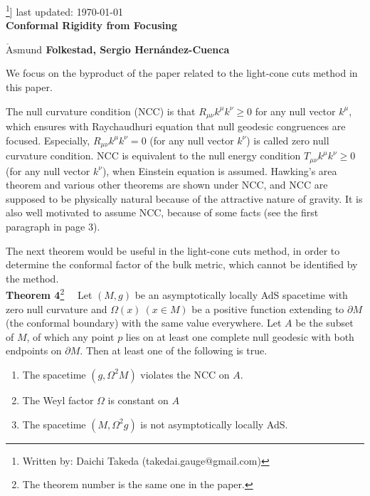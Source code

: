 \documentclass[12pt]{article}
\date{}
\renewcommand{\thefootnote}{\fnsymbol{footnote}}
\begin{document}
{\Large\noindent
\footnote{
Written by: Daichi Takeda (takedai.gauge@gmail.com)
}]
\hfill{\normalsize last updated: \today}
\\[2mm]
\textbf{Conformal Rigidity from Focusing\cite{Folkestad:2021kyz}
}
}

\noindent
\hfill
\textbf{$\mathring{\textrm{A}}\textrm{smund}$ Folkestad, Sergio Hern\' andez-Cuenca}%

\renewcommand{\thefootnote}{\arabic{footnote})}
\setcounter{footnote}{0}
\vspace{12pt}
We focus on the byproduct of the paper related to the light-cone cuts method \cite{Engelhardt:2016wgb,Engelhardt:2016crc,Hernandez-Cuenca:2020ppu} in this paper.

The null curvature condition (NCC) is that $R_{\mu\nu}k^\mu k^\nu \geq 0$ for any null vector $k^\mu$, 
which ensures with Raychaudhuri equation that null geodesic congruences are focused.
Especially, $R_{\mu\nu}k^\mu k^\nu = 0$ (for any null vector $k^\nu$) is called zero null curvature condition.
NCC is equivalent to the null energy condition $T_{\mu\nu}k^\mu k^\nu \geq 0$ (for any null vector $k^\nu$), 
when Einstein equation is assumed.
Hawking's area theorem and various other theorems are shown under NCC, 
and NCC are supposed to be physically natural because of the attractive nature of gravity.
It is also well motivated to assume NCC, because of some facts (see the first paragraph in page 3).

The next theorem would be useful in the light-cone cuts method, 
in order to determine the conformal factor of the bulk metric, which cannot be identified by the method.
\\[12pt]
\textbf{Theorem 4}\footnote{
The theorem number is the same one in the paper.
}~~
Let $(M,g)$ be an asymptotically locally AdS spacetime with zero null curvature and $\Omega(x)~(x\in M)$ be a positive
 function extending to $\partial M$ (the conformal boundary) with the same value everywhere.
Let $A$ be the subset of $M$, of which any point $p$ lies on at least one complete null geodesic with both endpoints on 
$\partial M$.
Then at least one of the following is true.
\begin{enumerate}
	\item The spacetime $(g,\Omega^2M)$ violates the NCC on $A$.
	\item The Weyl factor $\Omega$ is constant on $A$
	\item The spacetime $(M,\Omega^2g)$ is not asymptotically locally AdS.
\end{enumerate}
\end{document}
